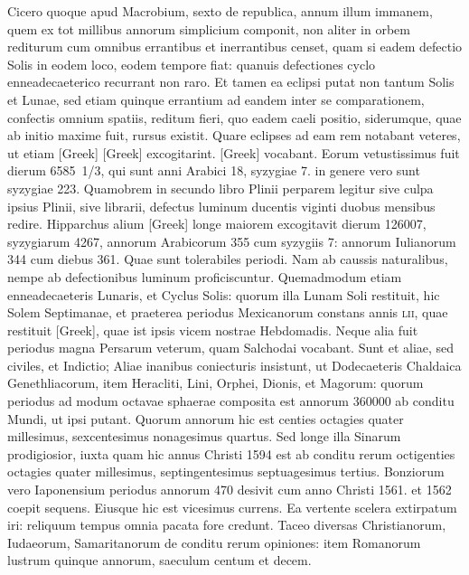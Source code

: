 Cicero quoque apud Macrobium,
sexto de republica, annum illum immanem, quem ex tot millibus
annorum simplicium componit, non aliter in orbem rediturum
cum omnibus errantibus et inerrantibus censet, quam si eadem defectio
Solis in eodem loco, eodem tempore fiat: quanuis defectiones
cyclo enneadecaeterico recurrant non raro.
Et tamen ea eclipsi putat
non tantum Solis et Lunae, sed etiam quinque errantium ad eandem
inter se comparationem, confectis omnium spatiis, reditum fieri, quo
eadem caeli positio, siderumque, quae ab initio maxime fuit, rursus existit.
Quare eclipses ad eam rem notabant veteres, ut etiam
 \textgreek{[Greek]}
\textgreek{[Greek]} excogitarint.
\textgreek{[Greek]} vocabant.
Eorum vetustissimus fuit
dierum 6585~1/3, qui sunt anni Arabici 18, syzygiae 7. in genere vero
sunt syzygiae 223.
Quamobrem in secundo libro Plinii perparem legitur
sive culpa ipsius Plinii, sive librarii, defectus luminum ducentis
viginti duobus mensibus redire.
Hipparchus alium \textgreek{[Greek]} longe
maiorem excogitavit dierum 126007, syzygiarum 4267, annorum
Arabicorum 355 cum syzygiis 7: annorum Iulianorum 344 cum
diebus 361.
Quae sunt tolerabiles periodi.
Nam ab caussis naturalibus,
nempe ab defectionibus luminum proficiscuntur.
Quemadmodum
etiam enneadecaeteris Lunaris, et Cyclus Solis: quorum illa Lunam
Soli restituit, hic Solem Septimanae, et praeterea periodus Mexicanorum
constans annis \textsc{lii}, quae restituit
 \textgreek{[Greek]}, quae ist ipsis
vicem nostrae Hebdomadis.
Neque alia fuit periodus magna Persarum
veterum, quam Salchodai vocabant.
Sunt et aliae, sed civiles, et Indictio;
Aliae inanibus coniecturis insistunt, ut Dodecaeteris Chaldaica
Genethliacorum, item Heracliti, Lini, Orphei, Dionis, et Magorum:
quorum periodus ad modum octavae sphaerae composita est annorum
360000 ab conditu Mundi, ut ipsi putant.
Quorum annorum hic est
centies octagies quater millesimus, sexcentesimus nonagesimus quartus.
Sed longe illa Sinarum prodigiosior, iuxta quam hic annus Christi
1594 est ab conditu rerum octigenties octagies quater millesimus,
septingentesimus septuagesimus tertius.
Bonziorum vero Iaponensium
periodus annorum 470 desivit cum anno Christi 1561. et 1562
coepit sequens.
Eiusque hic est vicesimus currens.
Ea vertente scelera
extirpatum iri: reliquum tempus omnia pacata fore credunt.
Taceo
diversas Christianorum, Iudaeorum, Samaritanorum de conditu rerum
opiniones: item Romanorum lustrum quinque annorum, saeculum
centum et decem.

